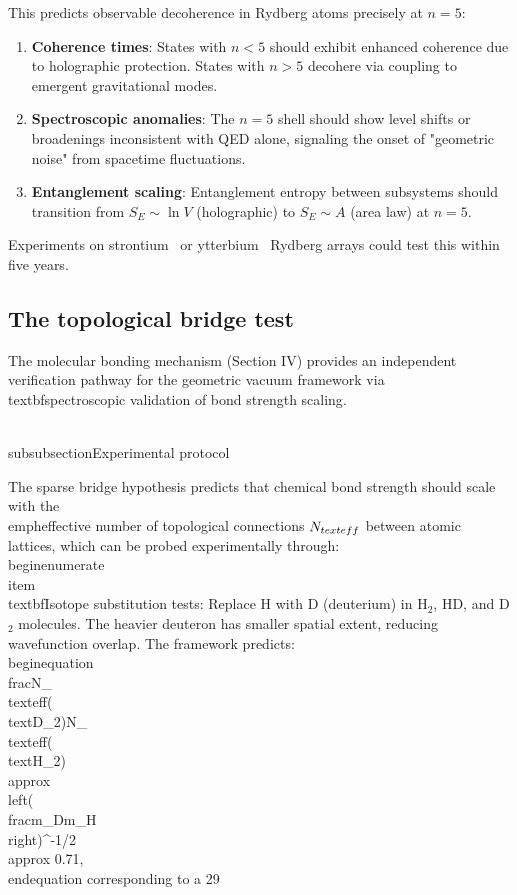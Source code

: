 \documentclass[aps,prd,twocolumn,superscriptaddress,groupedaddress,showpacs]{revtex4-2}
\begin{document}
This predicts observable decoherence in Rydberg atoms precisely at $n=5$:
\begin{enumerate}
\item \textbf{Coherence times}: States with $n < 5$ should exhibit enhanced coherence due to holographic protection. States with $n > 5$ decohere via coupling to emergent gravitational modes.

\item \textbf{Spectroscopic anomalies}: The $n=5$ shell should show level shifts or broadenings inconsistent with QED alone, signaling the onset of "geometric noise" from spacetime fluctuations.

\item \textbf{Entanglement scaling}: Entanglement entropy between subsystems should transition from $S_E \sim \ln V$ (holographic) to $S_E \sim A$ (area law) at $n=5$.
\end{enumerate}

Experiments on strontium~\cite{Madjarov2020} or ytterbium~\cite{Graham2022} Rydberg arrays could test this within five years.

\subsection{The topological bridge test}

The molecular bonding mechanism (Section IV) provides an independent verification pathway for the geometric vacuum framework via \\textbf{spectroscopic validation of bond strength scaling}.

\\subsubsection{Experimental protocol}

The sparse bridge hypothesis predicts that chemical bond strength should scale with the \\emph{effective number of topological connections} $N_{\\text{eff}}$ between atomic lattices, which can be probed experimentally through:
\\begin{enumerate}
\\item \\textbf{Isotope substitution tests}: Replace H with D (deuterium) in H$_2$, HD, and D$_2$ molecules. The heavier deuteron has smaller spatial extent, reducing wavefunction overlap. The framework predicts:
\\begin{equation}
\\frac{N_{\\text{eff}}(\\text{D}_2)}{N_{\\text{eff}}(\\text{H}_2)} \\approx \\left(\\frac{m_D}{m_H}\\right)^{-1/2} \\approx 0.71,
\\end{equation}
corresponding to a 29\\%
\end{document}
